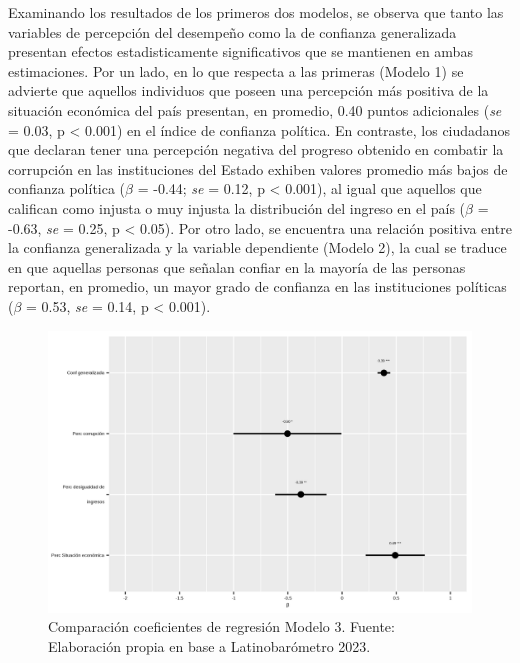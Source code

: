 \documentclass[12pt,twoside]{templates/facsothesis}
\begin{document}
Examinando los resultados de los primeros dos modelos, se observa que tanto las variables de percepción del desempeño como la de confianza generalizada presentan efectos estadisticamente significativos que se mantienen en ambas estimaciones. Por un lado, en lo que respecta a las primeras (Modelo 1) se advierte que aquellos individuos que poseen una percepción más positiva de la situación económica del país presentan, en promedio, 0.40 puntos adicionales (\emph{se} = 0.03, p \textless{} 0.001) en el índice de confianza política. En contraste, los ciudadanos que declaran tener una percepción negativa del progreso obtenido en combatir la corrupción en las instituciones del Estado exhiben valores promedio más bajos de confianza política (\(\beta\) = -0.44; \emph{se} = 0.12, p \textless{} 0.001), al igual que aquellos que califican como injusta o muy injusta la distribución del ingreso en el país (\(\beta\) = -0.63, \emph{se} = 0.25, p \textless{} 0.05). Por otro lado, se encuentra una relación positiva entre la confianza generalizada y la variable dependiente (Modelo 2), la cual se traduce en que aquellas personas que señalan confiar en la mayoría de las personas reportan, en promedio, un mayor grado de confianza en las instituciones políticas (\(\beta\) = 0.53, \emph{se} = 0.14, p \textless{} 0.001).

\begin{figure}[!ht]

{\centering \includegraphics[width=1\linewidth,]{IPO/output/graphs/coeficientes} 

}

\caption{Comparación coeficientes de regresión Modelo 3. Fuente: Elaboración propia en base a Latinobarómetro 2023.}\label{fig:grafico-3}
\end{figure}
\end{document}

